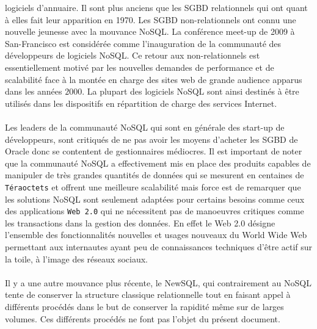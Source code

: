 logiciels d'annuaire. Il sont plus anciens que les \textsf{SGBD}
relationnels qui ont quant à elles fait leur apparition en 1970. Les
\textsf{SGBD} non-relationnels ont connu une nouvelle jeunesse avec la
mouvance \textsf{NoSQL}. La conférence meet-up de 2009
à \textsf{San-Francisco} est considérée comme l'inauguration de la
communauté des développeurs de logiciels \textsf{NoSQL}. Ce retour aux
non-relationnels est essentiellement motivé par les nouvelles demandes
de performance et de scalabilité face à la montée en charge des sites
web de grande audience apparus dans les années $2000$. La plupart des
logiciels \textsf{NoSQL} sont ainsi destinés à être utilisés dans les
dispositifs en répartition de charge des services \textsf{Internet}.
\\ \\ 
Les leaders de la communauté \textsf{NoSQL} qui sont en générale
des \textsf{start-up} de développeurs, sont critiqués de ne pas avoir
les moyens d'acheter les \textsf{SGBD} de Oracle donc se contentent de
gestionnaires médiocres. Il est important de noter que la communauté
\textsf{NoSQL} a effectivement mis en place des produits capables de
manipuler de très grandes quantités de données qui se mesurent en
centaines de \texttt{Téraoctets} et offrent une meilleure scalabilité
mais force est de remarquer que les solutions \textsf{NoSQL} sont
seulement adaptées pour certains besoins comme ceux des applications
\texttt{Web 2.0} qui ne nécessitent pas de manoeuvres critiques comme
les transactions dans la gestion des données. En effet le \textsf{Web
  2.0} désigne l'ensemble des fonctionnalités nouvelles et usages
nouveaux du \textsf{World Wide Web} permettant aux internautes ayant
peu de connaissances techniques d’être actif sur la toile, à l’image
des réseaux sociaux.  
\\\\ 
Il y a une autre mouvance plus récente, le
\textsf{NewSQL}, qui contrairement au \textsf{NoSQL}
tente de conserver la structure classique relationnelle tout en
faisant appel à différents procédés dans le but de conserver la
rapidité même sur de larges volumes\cite{newSQL}. Ces différents
procédés ne font pas l'objet du présent document.
